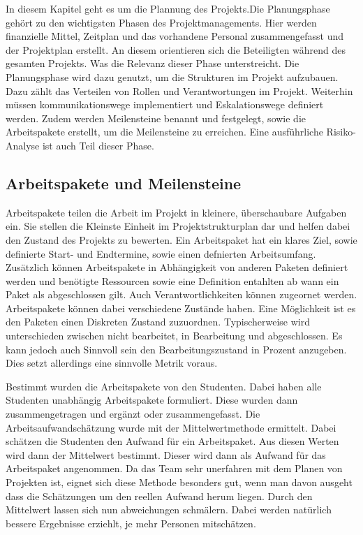 \documentclass[ThesisDJ.tex]{subfiles}
\begin{document}
In diesem Kapitel geht es um die Plannung des Projekts.Die Planungsphase gehört zu den wichtigsten Phasen des Projektmanagements. Hier werden finanzielle Mittel, Zeitplan und das vorhandene Personal zusammengefasst und der Projektplan erstellt. An diesem orientieren sich die Beteiligten während des gesamten Projekts. Was die Relevanz dieser Phase unterstreicht. Die Planungsphase wird dazu genutzt, um die Strukturen im Projekt aufzubauen. Dazu zählt das Verteilen von Rollen und Verantwortungen im Projekt. Weiterhin müssen kommunikationswege implementiert und Eskalationswege definiert werden. 
Zudem werden Meilensteine benannt und festgelegt, sowie die Arbeitspakete erstellt, um die Meilensteine zu erreichen. Eine ausführliche Risiko-Analyse ist auch Teil dieser Phase. 

\subsection{Arbeitspakete und Meilensteine}
Arbeitspakete teilen die Arbeit im Projekt in kleinere, überschaubare Aufgaben ein. Sie stellen die Kleinste Einheit im Projektstrukturplan dar und helfen dabei den Zustand des Projekts zu bewerten.
Ein Arbeitspaket hat ein klares Ziel, sowie definierte Start- und Endtermine, sowie einen defnierten Arbeitsumfang. Zusätzlich können Arbeitspakete in Abhängigkeit von anderen Paketen definiert werden und benötigte Ressourcen sowie eine Definition entahlten ab wann ein Paket als abgeschlossen gilt. Auch Verantwortlichkeiten können zugeornet werden. 
Arbeitspakete können dabei verschiedene Zustände haben. Eine Möglichkeit ist es den Paketen einen Diskreten Zustand zuzuordnen. Typischerweise wird unterschieden zwischen nicht bearbeitet, in Bearbeitung und abgeschlossen. Es kann jedoch auch Sinnvoll sein den Bearbeitungszustand in Prozent anzugeben. Dies setzt allerdings eine sinnvolle Metrik voraus. 

Bestimmt wurden die Arbeitspakete von den Studenten. Dabei haben alle Studenten unabhängig Arbeitspakete formuliert. Diese wurden dann zusammengetragen und ergänzt oder zusammengefasst.
Die Arbeitsaufwandschätzung wurde mit der Mittelwertmethode ermittelt. Dabei schätzen die Studenten den Aufwand für ein Arbeitspaket. Aus diesen Werten wird dann der Mittelwert bestimmt. Dieser wird dann als Aufwand für das Arbeitspaket angenommen. 
Da das Team sehr unerfahren mit dem Planen von Projekten ist, eignet sich diese Methode besonders gut, wenn man davon ausgeht dass die Schätzungen um den reellen Aufwand herum liegen. Durch den Mittelwert lassen sich nun abweichungen schmälern. Dabei werden natürlich bessere Ergebnisse erziehlt, je mehr Personen mitschätzen. 
\end{document}
